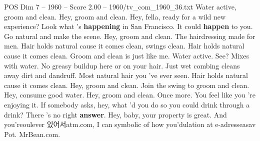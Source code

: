 \begin{textsample}{POS Dim 7 – 1960 – Score 2.00 – 1960/tv\_com\_1960\_36.txt}  \label{ex:f7_pos_026}
Water active, groom and clean.
Hey, groom and clean.
Hey, fella, ready for a wild new experience?
Look what 's \textbf{happening} in San Francisco.
It could \textbf{happen} to you.
Go natural and make the scene.
Hey, groom and clean.
The hairdressing made for men.
Hair holds natural cause it comes clean, swings clean.
Hair holds natural cause it comes clean.
Groom and clean is just like me.
Water active.
See?
Mixes with water.
No greasy buildup here or on your hair.
Just wet combing cleans away dirt and dandruff.
Most natural hair you 've ever seen.
Hair holds natural cause it comes clean.
Hey, groom and clean.
Join the swing to groom and clean.
Hey, consume good water.
Hey, groom and clean.
Once more.
You feel like you 're enjoying it.
If somebody asks, hey, what 'd you do so you could drink through a drink?
There 's no right \textbf{answer}.
Hey, baby, your property is great.
And you'reoulever 있어서atm.com, I can symbolic of how you'dulation at e-adresseasav Pot.
MrBean.com.

\end{textsample}

